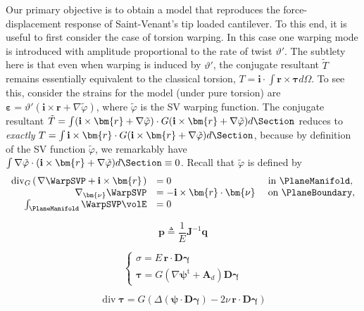 Our primary objective is to obtain a model that reproduces the force-displacement response of Saint-Venant's tip loaded cantilever. 
To this end, it is useful to first consider the case of torsion warping. In this case one warping mode is introduced with amplitude proportional to the rate of twist $\vartheta'$. 
The subtlety here is that even when warping is induced by $\vartheta'$, the conjugate resultant $\tilde{T}$ remains essentially equivalent to the classical torsion, $T=\mathbf{i}\cdot\int \bm{r}\times\bm{\tau}d\Omega$. 
To see this, consider the strains for the model (under pure torsion) are $\bm{\varepsilon} = \vartheta'(\mathbf{i}\times\bm{r} + \nabla\tilde{\varphi})$, where $\tilde\varphi$ is the SV warping function. The conjugate resultant $\tilde{T} = \int (\mathbf{i}\times\bm{r} + \nabla\tilde{\varphi}) \cdot G (\mathbf{i}\times\bm{r} + \nabla\tilde{\varphi}) d\Section$ reduces to \emph{exactly} $T = \int \mathbf{i}\times\bm{r} \cdot G (\mathbf{i}\times\bm{r} + \nabla\tilde{\varphi}) d\Section$, because by definition of the SV function $\tilde\varphi$, we remarkably have $\int \nabla\tilde\varphi \cdot (\mathbf{i}\times\bm{r} + \nabla\tilde{\varphi}) d\Section \equiv 0$. 
Recall that $\tilde\varphi$ is defined by
\begin{equation}
\begin{array}{rll}
\operatorname{div}_G\left(\left.\nabla \WarpSVP+\mathbf{i} \times\bm{r}\right.\right) &=0 & \text { in } \PlaneManifold, \\
\nabla_{\bm{\nu}} \WarpSVP &=-\mathbf{i}\times\bm{r} \cdot \bm{\nu} & \text { on } \PlaneBoundary, \\
\int_{\PlaneManifold} \WarpSVP \volE &= 0
\end{array}
\label{eq:warp-sv-bvp}
\end{equation}

\begin{equation}
\bm{p} \triangleq \frac{1}{E}\mathbf{J}^{-1}\bm{q}
\end{equation}

\begin{equation*}
\begin{cases}
    \sigma = E \, \bm{r}\cdot\mathbf{D}\bm{\gamma}\\
    \bm{\tau} = G\left(\nabla \bm{\psi}^{\mathrm{t}} + \bm{A}_{d}\right) \mathbf{D}\bm{\gamma}
\end{cases}
\end{equation*}


\begin{equation*}
    \operatorname{div} \bm{\tau} = 
    G(\Delta (\bm{\psi} \cdot\mathbf{D}\bm{\gamma}) - 2 \nu \, \bm{r}\cdot \mathbf{D}\bm{\gamma})
\end{equation*}

